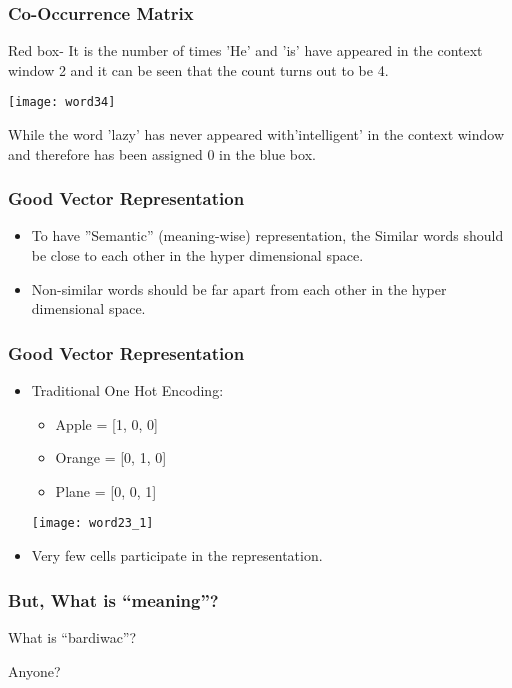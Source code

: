 \begin{frame}[fragile]\frametitle{Co-Occurrence Matrix}
Red box- It is the number of times 'He' and 'is' have appeared in the context window 2 and it can be seen that the count turns out to be 4. 
\begin{center}
\texttt{[image: word34]}
\end{center}
While the word 'lazy' has never appeared with'intelligent' in the context window and therefore has been assigned 0 in the blue box.
\end{frame}



\begin{frame}[fragile]\frametitle{Good Vector Representation}
\begin{itemize}
\item To have ''Semantic'' (meaning-wise) representation, the Similar words should be close to each other in the hyper dimensional space.
\item Non-similar words should be far apart from each other in the hyper dimensional space.
\end{itemize}
\end{frame}

\begin{frame}[fragile]\frametitle{Good Vector Representation}
\begin{itemize}
\item Traditional One Hot Encoding:
	\begin{itemize}
	\item Apple = [1, 0, 0]
	\item Orange = [0, 1, 0]
	\item Plane = [0, 0, 1]
	\end{itemize}
\begin{center}
\texttt{[image: word23\_1]}
\end{center}
\item Very few cells participate in the representation.
\end{itemize}
\end{frame}


\begin{frame}[fragile]\frametitle{But, What is ``meaning''?}
What is ``bardiwac''?

Anyone?
\end{frame}

